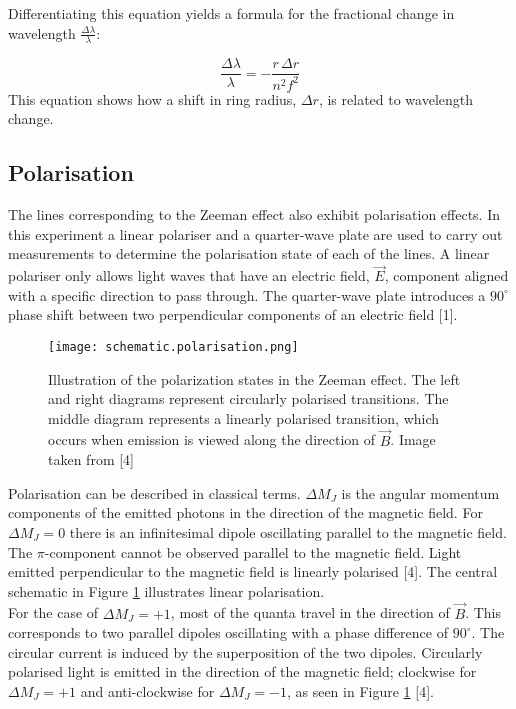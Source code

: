 \documentclass[11pt,twocolumn, a4paper]{article}
\numberwithin{equation}{section} %
\numberwithin{figure}{section} %
\numberwithin{table}{section} %
\begin{document}
Differentiating  this equation yields a formula for the fractional change in wavelength \(\frac{\Delta \lambda}{\lambda}\):

\begin{equation}\label{eq:wl}
\frac{\Delta \lambda}{\lambda} = - \frac{r \,\Delta r}{n^2 f^2}
\end{equation}
This equation shows how a shift in ring radius, \(\Delta r\), is related to wavelength change. 
\subsection{Polarisation}
The lines corresponding to the Zeeman effect also exhibit polarisation effects. In this experiment a linear polariser and a quarter-wave plate are used to carry out measurements to determine the polarisation state of each of the lines. A linear polariser only allows light waves that have an electric field, \(\vec{E}\), component aligned with a specific direction to pass through. The quarter-wave plate introduces a \(90^{\circ}\) phase shift between two perpendicular components of an electric field [1]. 

\begin{figure}[H]
    \centering
    \texttt{[image: schematic.polarisation.png]}
    \caption{Illustration of the polarization states in the Zeeman effect. The left and right diagrams represent circularly polarised transitions. The middle diagram represents a linearly polarised transition, which occurs when emission is viewed along the direction of \(\vec{B}\).  Image taken from [4] }
    \label{fig:pol}
\end{figure}

Polarisation can be described in classical terms. \(\Delta M_J\) is the angular momentum components of the emitted photons in the direction of the magnetic field. For \(\Delta M_J = 0 \) there is an infinitesimal dipole oscillating parallel to the magnetic field. The \(\pi\)-component cannot be observed parallel to the magnetic field. Light emitted perpendicular to the magnetic field is linearly polarised  [4].  The central schematic in Figure \ref{fig:pol} illustrates linear polarisation. \\ 

For the case of \(\Delta M_J = +1\), most of the quanta travel in the direction of \(\vec{B}\). This corresponds to two parallel dipoles oscillating with a phase difference of \(90^{\circ}\). The circular current is induced by the superposition of the two dipoles. Circularly polarised light is emitted in the direction of the magnetic field; clockwise for \(\Delta M_J = +1\) and anti-clockwise for \(\Delta M_J = -1\), as seen in Figure \ref{fig:pol} [4].
\end{document}
